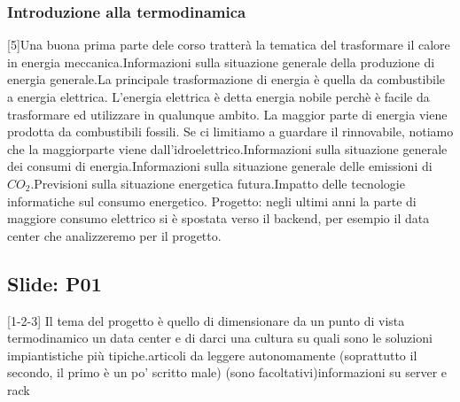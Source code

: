 \subsubsection{Introduzione alla termodinamica}
[5]\newline
[6] Una buona prima parte dele corso tratterà la tematica del trasformare il calore in energia meccanica.\newline
[7] Informazioni sulla situazione generale della produzione di energia generale.\newline
[8] La principale trasformazione di energia è quella da combustibile a energia elettrica. L'energia elettrica è detta energia nobile perchè è facile da trasformare ed utilizzare in qualunque ambito. La maggior parte di energia viene prodotta da combustibili fossili. Se ci limitiamo a guardare il rinnovabile, notiamo che la maggiorparte viene dall'idroelettrico.\newline
[9] Informazioni sulla situazione generale dei consumi di energia.\newline
[10-11] Informazioni sulla situazione generale delle emissioni di $CO_2$.\newline
[12] Previsioni sulla situazione energetica futura.\newline
[13] Impatto delle tecnologie informatiche sul consumo energetico. Progetto: negli ultimi anni la parte di maggiore consumo elettrico si è spostata verso il backend, per esempio il data center che analizzeremo per il progetto.
\subsection{Slide: P01}
[1-2-3] Il tema del progetto è quello di dimensionare da un punto di vista termodinamico un data center e di darci una cultura su quali sono le soluzioni impiantistiche più tipiche.\newline
[4] articoli da leggere autonomamente (soprattutto il secondo, il primo è un po' scritto male) (sono facoltativi)\newline
[5] informazioni su server e rack